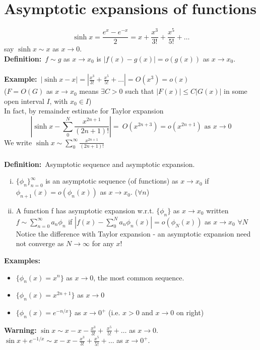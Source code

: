 \documentclass{article}
\newcommand{\definition}{\textbf{Definition:}}
\newcommand{\example}{\textbf{Example:}}
\newcommand{\examples}{\textbf{Examples:}}
\begin{document}
\section{Asymptotic expansions of functions}
\[ \sinh x = \frac{e^x - e^{-x}}{2} = x + \frac{x^3}{3!} + \frac{x^5}{5!} + \dots\]
say $\sinh x \sim x$ as $x \to 0$.
\\
\definition\ $f \sim g$ as $x \to x_0$ is $|f(x) - g(x)| = o(g(x))$ as $x \to x_0$.
\\
\\
\example\ $|\sinh x - x| = |\frac{x^3}{3!} + \frac{x^5}{5!} + \dots| = O(x^3) = o(x)$
\\
($F=O(G)$ as $x \to x_0$ means $\exists C>0$ such that $|F(x)| \leq C|G(x)|$ in
some open interval $I$, with $x_0 \in I$)
\\
In fact, by remainder estimate for Taylor expansion
\[ \left| \sinh x - \sum_{0}^{N} \frac{x^{2n+1}}{(2n+1)!} \right| = \
O(x^{2n+3}) = o(x^{2n+1}) \mbox{ as } x \to 0\]
We write $\sinh x \sim \sum_{0}^{\infty} \frac{x^{2n+1}}{(2n+1)!}$
\\
\\
\definition\ Asymptotic sequence and asymptotic expansion.
\begin{enumerate}[(i)]
\item $\{\phi_n\}_{n=0}^{\infty}$ is an asymptotic sequence (of functions) as 
		$x \to x_0$ if $\phi_{n+1}(x) = o(\phi_n(x))$ as $x \to x_0$. ($\forall n$)
\item A function f has asymptotic expansion w.r.t. $\{ \phi_n\}$ as $x \to x_0$ 
		written $f \sim \sum_{n=0}^{\infty} a_n \phi_n$ if 
		$\left| f(x) - \sum_0^N a_n \phi_n(x) \right| = o(\phi_N(x))$ as $x \to x_0$
		$\forall N$
		\\
		Notice the difference with Taylor expansion - an asymptotic expansion 
		need not converge as $N\to \infty$ for any $x$!
\end{enumerate}
\examples\ 
\begin{itemize}
\item $\{ \phi_n(x) = x^n \}$ as $x \to 0$, the most common sequence.
\item $\{ \phi_n(x) = x^{2n+1} \}$ as $x \to 0$
\item $\{ \phi_n(x) = e^{-n/x} \}$ as $x \to 0^+$ (i.e. $x>0$ and $x\to 0$ on right)
\end{itemize}
%
%
\begin{framed}
\noindent \textbf{Warning:} $\sin x \sim x - x - \frac{x^3}{3!} +\
\frac{x^5}{5!} + \dots$ as $x \to 0$.
\\
$\sin x + e^{-1/x} \sim x - x - \frac{x^3}{3!} + \frac{x^5}{5!} + \dots$ 
as $x \to 0^{+}$.
\end{framed}
\end{document}
